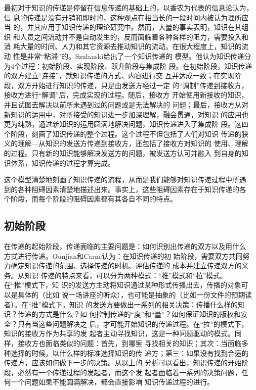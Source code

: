 \documentclass[12pt,a4paper]{ctexart}
\begin{document}
最初对于知识的传递是停留在信息传递的基础上的，以香农\cite{Shannon1949}为代表的信息论认为，信
息的传递是没有开销和即时的，这种观点在相当长的一段时间内被认为理所应当
的，并其应用于知识传递的理论研究中。然而，大量的事实表明，知识在其组织
和人员之间流动并不是自动发生的，反而面临着各种各样的阻力，需要投入和消
耗大量的时间、人力和其它资源去推动知识的流动。在很大程度上，知识的流动
性是非常“粘滞”的。Szulanski\cite{szulanski2000pkt}给出了一个知识传递的
模型。他认为知识传递分为4个过程：初始阶段、实现阶段、跃升阶段与集成阶
段。在初始阶段，知识传递的双方建立“连接”，就知识传递的方式、内容进行交
互并达成一致；在实现阶段，双方开始进行知识的传递，只是由发送方经过一定
的“调制”传递到接收方，接收方进行“解调”后，完成实现的过程。随后，接收方
开始使用新接收的知识，并且试图去解决以前所未遇到过的问题或是无法解决的
问题；最后，接收方从对新知识的运用中，对所接受的知识进一步加深理解，融会贯通，对知识
的应用也更为纯熟，通过新知识的运用圆满地解决问题，知识传递进入了集成阶
段。这四个阶段，刻画了知识传递的整个过程。这个过程不但包括了人们对知识
传递的狭义的理解---从知识的发送方传递到接收方，还包括了接收方对知识的
使用、理解的过程。只有新的知识能够解决发送方的问题，被发送方认可并融入
到自身的知识体系，知识传递的过程才算完成。

这个模型清楚地刻画了知识传递的流程，从而是我们能够对知识传递过程中所遇
到的各种阻碍因素清楚地描述出来。事实上，这些阻碍因素存在于知识传递的各
个阶段，而每个阶段的阻碍因素都有其各自不同的特点。

\subsection{初始阶段}


在传递的起始阶段，传递面临的主要问题是：如何识别出传递的双方以及用什么
方式进行传递。Ounjian和Carne\cite{ounjian1987sfa}认为：在知识传递的初
始阶段，需要双方共同努力确定知识传递的范围、选择传递的时机、评估传递的
成本并建立传递双方的义务。从知识
传递的特点来看，可以分为两种模式：“推”模式和“拉”模式。在“推”模式下，知
识的发送方主动将知识通过某种形式传播出去，传播的对象可以是具体的（比如
说一场讲座的听众），也可能是抽象的（比如一份文件的预期读者）。在“推”模式下，知识
的发送方要做出一系列的相关决策：传播什么样的知识？传递的方式是什么？如
何控制传递的“度”和“量”？如何保证知识的版权和安全？只有当这些问题解决之
后，才可能开始知识的传递过程。在“拉”的模式下，知识的接收方作为共享的发
起者主动寻找知识，这是一种问题驱动的模式。同样，接收方也面临类似的问题：首先，到哪里
寻找相关的知识；其次：当面临多种选择的时候，以什么样的标准选择知识的传
递方；第三：如果没有找到合适的传递方，应该如何做下一步的决策。从以上的
分析可以看出，知识传递的开始阶段，必然有一个传递过程的发起者，而这个发
起者面临着一系列的决策问题，任何一个问题如果不能圆满解决，都会直接影响
知识传递过程的进行。
\end{document}
